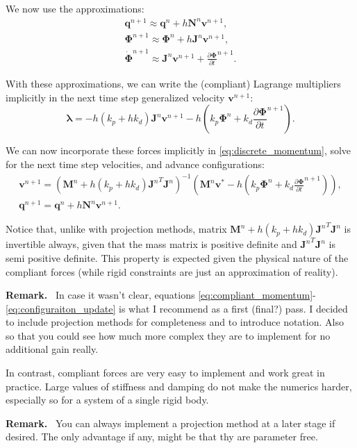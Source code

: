\documentclass{article}
\newcommand{\mf}[1]{{\mathbf{#1}}}
\newenvironment{remark}{\begin{remarkbox}\textbf{Remark.}~}{\end{remarkbox}}
\begin{document}
We now use the approximations:
\begin{eqnarray}
    \mf{q}^{n+1} \approx \mf{q}^{n} + h \mf{N}^n \mf{v}^{n+1},\\
    \mf{\Phi}^{n+1} \approx \mf{\Phi}^{n} + h \mf{J}^n \mf{v}^{n+1},\\
    \dot{\mf{\Phi}}^{n+1} \approx \mf{J}^n \mf{v}^{n+1} + \frac{\partial\mf{\Phi}}{\partial t}^{n+1}.
\end{eqnarray}

With these approximations, we can write the (compliant) Lagrange multipliers
implicitly in the next time step generalized velocity $\mf{v}^{n+1}$:
\begin{equation}
    \bm{\lambda} = -h(k_p + h k_d) \mf{J}^n \mf{v}^{n+1} - h\left(k_p\mf{\Phi}^{n}+k_d\frac{\partial\mf{\Phi}}{\partial t}^{n+1}\right).
\end{equation}

We can now incorporate these forces implicitly in \eqref{eq:discrete_momentum},
solve for the next time step velocities, and advance configurations:
\begin{eqnarray}
    \mf{v}^{n+1} = \left(\mf{M}^n + h(k_p + h k_d){\mf{J}^n}^T\mf{J}^n\right)^{-1}\left(\mf{M}^n\mf{v}^*-h\left(k_p\mf{\Phi}^{n}+k_d\frac{\partial\mf{\Phi}}{\partial t}^{n+1}\right)\right),
    \label{eq:compliant_momentum}\\
    \mf{q}^{n+1} = \mf{q}^{n} + h \mf{N}^n \mf{v}^{n+1}.
    \label{eq:configuraiton_update}
\end{eqnarray}

Notice that, unlike with projection methods, matrix $\mf{M}^n + h(k_p + h
k_d){\mf{J}^n}^T\mf{J}^n$ is invertible always, given that the mass matrix is
positive definite and ${\mf{J}^n}^T\mf{J}^n$ is semi positive definite. This
property is expected given the physical nature of the compliant forces (while
rigid constraints are just an approximation of reality).

\begin{remark}
In case it wasn't clear, equations
\eqref{eq:compliant_momentum}-\eqref{eq:configuraiton_update} is what I
recommend as a first (final?) pass. I decided to include projection methods for
completeness and to introduce notation. Also so that you could see how much more
complex they are to implement for no additional gain really. 

In contrast, compliant forces are very easy to implement and work great in
practice. Large values of stiffness and damping do not make the numerics harder,
especially so for a system of a single rigid body.
\end{remark}

\begin{remark}
You can always implement a projection method at a later stage if desired. The
only advantage if any, might be that thy are parameter free.
\end{remark}    

\end{document}
